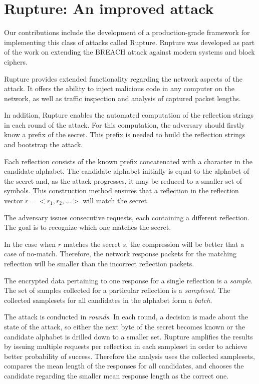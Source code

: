 \section{Rupture: An improved attack}\label{subsec:rupture}
Our contributions include the development of a production-grade framework for
implementing this class of attacks called Rupture. Rupture was developed as
part of the work on extending the BREACH attack against modern systems and block
ciphers.

Rupture provides extended functionality regarding the network aspects of the
attack. It offers the ability to inject malicious code in any computer on the
network, as well as traffic inspection and analysis of captured packet lengths.

In addition, Rupture enables the automated computation of the reflection strings
in each round of the attack. For this computation, the adversary should firstly
know a prefix of the secret. This prefix is needed to build the reflection
strings and bootstrap the attack.

Each reflection consists of the known prefix concatenated with a character in
the candidate alphabet. The candidate alphabet initially is equal to the
alphabet of the secret and, as the attack progresses, it may be reduced to a
smaller set of symbols. This construction method ensures that a reflection in
the reflection vector $\bar{r} = <r_1, r_2, ...>$ will match the secret.

The adversary issues consecutive requests, each containing a different
reflection. The goal is to recognize which one matches the secret.

In the case when $r$ matches the secret $s$, the compression will be better that
a case of no-match. Therefore, the network response packets for the matching
reflection will be smaller than the incorrect reflection packets.

The encrypted data pertaining to one response for a single reflection is a
\textit{sample}. The set of samples collected for a particular reflection is a
\textit{sampleset}. The collected samplesets for all candidates in the alphabet
form a \textit{batch}.

The attack is conducted in \textit{rounds}. In each round, a decision is made
about the state of the attack, so either the next byte of the secret becomes
known or the candidate alphabet is drilled down to a smaller set. Rupture
amplifies the results by issuing multiple requests per reflection in each
sampleset in order to achieve better probability of success. Therefore the
analysis uses the collected samplesets, compares the mean length of the
responses for all candidates, and chooses the candidate regarding the smaller
mean response length as the correct one.

